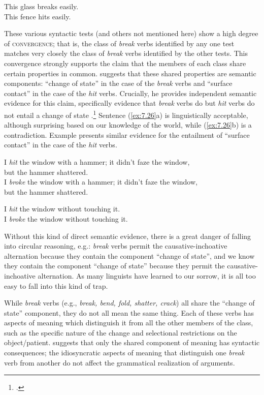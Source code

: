 \ea \label{ex:7.25}
\ea  This glass breaks easily.\\
\ex *This fence hits easily.
                       \z
\z


These various syntactic tests (and others not mentioned here) show a high degree of \textsc{convergence}; that is, the class of \textit{break} verbs identified by any one test matches very closely the class of \textit{break} verbs identified by the other tests. This convergence strongly supports the claim that the members of each class share certain properties in common. \citet[125]{Fillmore1970} suggests that these shared properties are semantic components: “change of state” in the case of the \textit{break} verbs and “surface contact” in the case of the \textit{hit} verbs. Crucially, he provides independent semantic evidence for this claim, specifically evidence that \textit{break} verbs do but \textit{hit} verbs do not entail a change of state .\footnote{\citet[125]{Fillmore1970}.} Sentence (\ref{ex:7.26}a) is linguistically acceptable, although surprising based on our knowledge of the world, while (\ref{ex:7.26}b) is a contradiction. Example  presents similar evidence for the entailment of “surface contact” in the case of the \textit{hit} verbs.
 
\ea \label{ex:7.26}
\ea  I \textit{hit} the window with a hammer; it didn’t faze the window,\\
  but the hammer shattered.\\
\ex *I \textit{broke} the window with a hammer; it didn’t faze the window,\\
  but the hammer shattered.
                       \z
\z

\ea \label{ex:7.27}
\ea *I \textit{hit} the window without touching it.\\
\ex  I \textit{broke} the window without touching it.
                       \z
\z


Without this kind of direct semantic evidence, there is a great danger of falling into circular reasoning, e.g.: \textit{break} verbs permit the causative-inchoative alternation because they contain the component “change of state”, and we know they contain the component “change of state” because they permit the causative-inchoative alternation. As many linguists have learned to our sorrow, it is all too easy to fall into this kind of trap.



While \textit{break} verbs (e.g., \textit{break, bend, fold, shatter, crack}) all share the “change of state” component, they do not all mean the same thing. Each of these verbs has aspects of meaning which distinguish it from all the other members of the class, such as the specific nature of the change and selectional restrictions on the object/patient. \citet[131]{Fillmore1970} suggests that only the shared component of meaning has syntactic consequences; the idiosyncratic aspects of meaning that distinguish one \textit{break} verb from another do not affect the grammatical realization of arguments.



